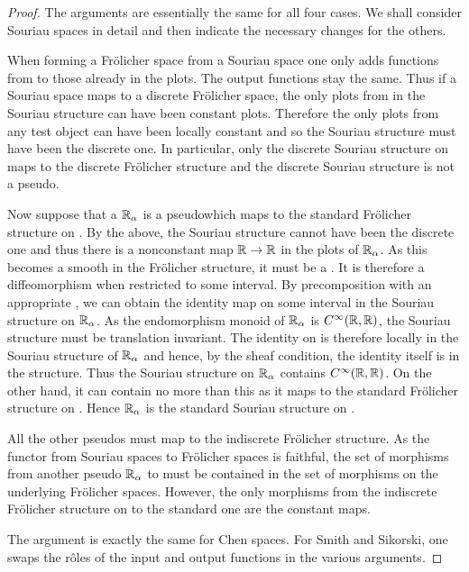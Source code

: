 \documentclass[%
12pt,%
arxiv,%
defaults
]{myclass}
\begin{document}
\begin{proof}
The arguments are essentially the same for all four cases.
We shall consider Souriau spaces in detail and then indicate the necessary changes for the others.

When forming a Fr\"olicher space from a Souriau space one only adds functions from \R to those already in the plots.
The output functions stay the same.
Thus if a Souriau space maps to a discrete Fr\"olicher space, the only plots from \R in the Souriau structure can have been constant plots.
Therefore the only plots from any test object can have been locally constant and so the Souriau structure must have been the discrete one.
In particular, only the discrete Souriau structure on \R maps to the discrete Fr\"olicher structure and the discrete Souriau structure is not a pseudo\enhyp{}\R.

Now suppose that a \(\mathbb{R}_\alpha\) is a pseudo\enhyp{}\R which maps to the standard Fr\"olicher structure on \R.
By the above, the Souriau structure cannot have been the discrete one and thus there is a non\enhyp{}constant map \(\mathbb{R} \to \mathbb{R}\) in the plots of \(\mathbb{R}_\alpha\).
As this becomes a smooth in the Fr\"olicher structure, it must be a \cimap.
It is therefore a diffeomorphism when restricted to some interval.
By precomposition with an appropriate \cimap, we can obtain the identity map on some interval in the Souriau structure on \(\mathbb{R}_\alpha\).
As the endomorphism monoid of \(\mathbb{R}_\alpha\) is \(C^\infty(\mathbb{R},\mathbb{R})\), the Souriau structure must be translation invariant.
The identity on \R is therefore locally in the Souriau structure of \(\mathbb{R}_\alpha\) and hence, by the sheaf condition, the identity itself is in the structure.
Thus the Souriau structure on \(\mathbb{R}_\alpha\) contains \(C^\infty(\mathbb{R},\mathbb{R})\).
On the other hand, it can contain no more than this as it maps to the standard Fr\"olicher structure on \R.
Hence \(\mathbb{R}_\alpha\) is the standard Souriau structure on \R.

All the other pseudo\enhyp{}\R{}s must map to the indiscrete Fr\"olicher structure.
As the functor from Souriau spaces to Fr\"olicher spaces is faithful, the set of morphisms from another pseudo\enhyp{}\R{} \(\mathbb{R}_\alpha\) to \R must be contained in the set of morphisms on the underlying Fr\"olicher spaces.
However, the only morphisms from the indiscrete Fr\"olicher structure on \R to the standard one are the constant maps.

The argument is exactly the same for Chen spaces.
For Smith and Sikorski, one swaps the r\^oles of the input and output functions in the various arguments.
\end{proof}
\end{document}
